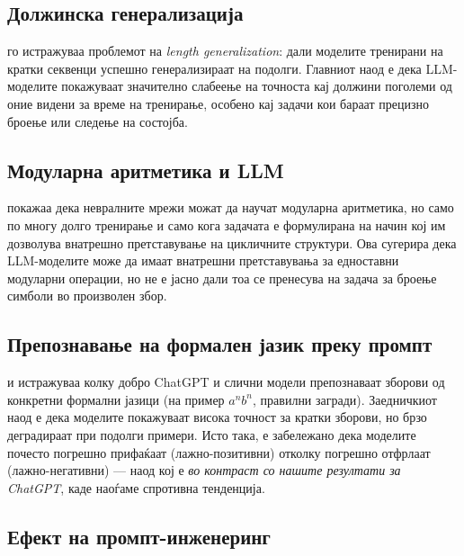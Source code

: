 \documentclass[12pt,a4paper]{article}
\theoremstyle{definition}
\begin{document}
\vspace{0.8em}

\subsection{Должинска генерализација}

\textcite{anil2022exploring} го истражуваа проблемот на \textit{length generalization}: дали моделите тренирани на кратки секвенци успешно генерализираат на подолги. Главниот наод е дека LLM-моделите покажуваат значително слабеење на точноста кај должини поголеми од оние видени за време на тренирање, особено кај задачи кои бараат прецизно броење или следење на состојба.

\vspace{0.8em}

\subsection{Модуларна аритметика и LLM}

\textcite{power2022grokking} покажаа дека невралните мрежи можат да научат модуларна аритметика, но само по многу долго тренирање и само кога задачата е формулирана на начин кој им дозволува внатрешно претставување на цикличните структури. Ова сугерира дека LLM-моделите може да имаат внатрешни претставувања за едноставни модуларни операции, но не е јасно дали тоа се пренесува на задача за броење симболи во произволен збор.

\vspace{0.8em}

\subsection{Препознавање на формален јазик преку промпт}

\textcite{hewitt2020rnns} и \textcite{anil2022exploring} истражуваа колку добро ChatGPT и слични модели препознаваат зборови од конкретни формални јазици (на пример $a^nb^n$, правилни загради). Заедничкиот наод е дека моделите покажуваат висока точност за кратки зборови, но брзо деградираат при подолги примери. Исто така, е забележано дека моделите почесто погрешно прифаќаат (лажно-позитивни) отколку погрешно отфрлаат (лажно-негативни) --- наод кој е \textit{во контраст со нашите резултати за ChatGPT}, каде наоѓаме спротивна тенденција.

\vspace{0.8em}

\subsection{Ефект на промпт-инженеринг}
\end{document}
